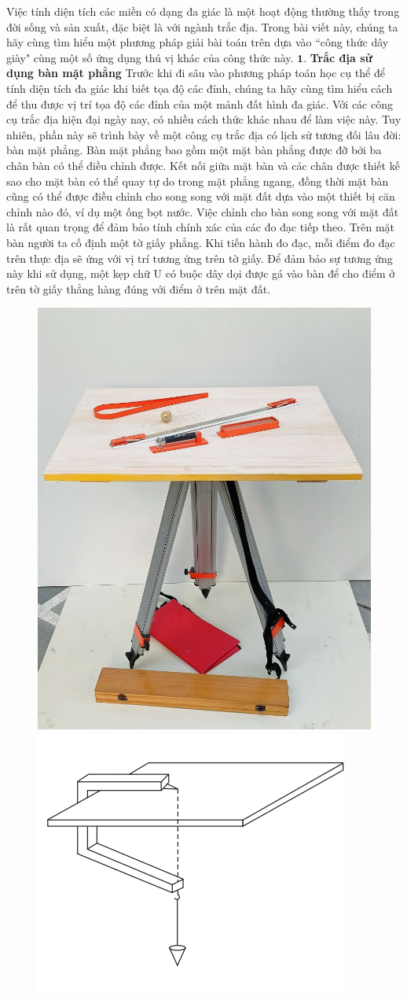 \begin{multicols}{2}
	Việc tính diện tích các miền có dạng đa giác là một hoạt động thường thấy trong đời sống và sản xuất, đặc biệt là với ngành trắc địa. Trong bài viết này, chúng ta hãy cùng tìm hiểu một phương pháp giải bài toán trên dựa vào ``công thức dây giày" cùng một số ứng dụng thú vị khác của công thức này.
	\vskip 0.1cm
	$\pmb{1.}$ \textbf{\color{toanhocdoisong}Trắc địa sử dụng bàn mặt phẳng}
	\vskip 0.1cm
	Trước khi đi sâu vào phương pháp toán học cụ thể để tính diện tích đa giác khi biết tọa độ các đỉnh, chúng ta hãy cùng tìm hiểu cách để thu được vị trí tọa độ các đỉnh của một mảnh đất hình đa giác. Với các công cụ trắc địa hiện đại ngày nay, có nhiều cách thức khác nhau để làm việc này. Tuy nhiên, phần này sẽ trình bày về một công cụ trắc địa có lịch sử tương đối lâu đời: bàn mặt phẳng.
	\vskip 0.1cm
	Bàn mặt phẳng bao gồm một mặt bàn phẳng được đỡ bởi ba chân bàn có thể điều chỉnh được. Kết nối giữa mặt bàn và các chân được thiết kế sao cho mặt bàn có thể quay tự do trong mặt phẳng ngang, đồng thời mặt bàn cũng có thể được điều chỉnh cho song song với mặt đất dựa vào một thiết bị căn chỉnh nào đó, ví dụ một ống bọt nước. Việc chỉnh cho bàn song song với mặt đất là rất quan trọng để đảm bảo tính chính xác của các đo đạc tiếp theo.
	\vskip 0.1cm
	Trên mặt bàn người ta cố định một tờ giấy phẳng. Khi tiến hành đo đạc, mỗi điểm đo đạc trên thực địa sẽ ứng với vị trí tương ứng trên tờ giấy. Để đảm bảo sự tương ứng này khi sử dụng, một kẹp chữ U có buộc dây dọi được gá vào bàn để cho điểm ở trên tờ giấy thẳng hàng đúng với điểm ở trên mặt đất.
	\begin{figure}[H]
		\vspace*{-5pt}
		\centering
		\captionsetup{labelformat= empty, justification=centering}
		\includegraphics[height= 0.5\linewidth]{1}
		\includegraphics[height= 0.5\linewidth]{2}

\end{figure}
\end{multicols}
